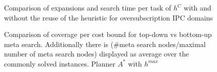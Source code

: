 \begin{figure}[ht]
	\scriptsize
	\begin{minipage}{0.5\textwidth}
		
	\end{minipage}
	\begin{minipage}{0.2\textwidth}
		
	\end{minipage}
	\hfill
	\begin{minipage}{0.2\textwidth}
		
	\end{minipage}
	\begin{minipage}{0.2\textwidth}
		
	\end{minipage}
	\hfill
	\begin{minipage}{0.2\textwidth}
		
	\end{minipage}

	\caption{Comparison of expansions and search time per task of $h^{C}$ with and 
	without the reuse of the heuristic for oversubscription IPC domains}
\end{figure}

%


\begin{figure}[ht]
	\small
	\centering
	
	\caption{Comparison of coverage per cost bound for top-down vs bottom-up meta search.
	Additionally there is (\#meta search nodes/maximal number of meta search nodes) displayed as average over the commonly solved instances.
	Planner $A^*$ with $h^{max}$}
\end{figure}


%
%
%
%


